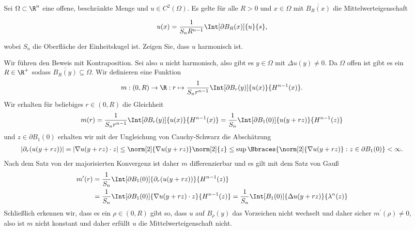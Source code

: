 
\begin{exercise}

Sei $\Omega \subset \R^n$ eine offene, beschränkte Menge und $u \in C^2(\Omega)$.
Es gelte für alle $R > 0$ und $x \in \Omega$ mit $\overline{B_R(x)}$ die Mittelwerteigenschaft

\begin{align*}
    u(x)
    =
    \frac{1}{S_n R^{n-1}}
    \Int[\partial B_R(x)]{u}{s},
\end{align*}

wobei $S_n$ die Oberfläche der Einheitskugel ist.
Zeigen Sie, dass $u$ harmonisch ist.

\end{exercise}


\begin{solution}

Wir führen den Beweis mit Kontraposition. Sei also $u$ nicht harmonisch, also gibt es $y \in \Omega$ mit $\Delta u(y) \neq 0$. Da $\Omega$ offen ist gibt es ein $R \in \R^+$ sodass $\overline{B_R(y)} \subseteq \Omega$. Wir definieren eine Funktion 
\begin{align*}
m: (0, R) \to \R : r \mapsto \frac{1}{S_n r^{n - 1}} \Int[\partial B_r(y)]{u(x)}{H^{n - 1}(x)}.
\end{align*}
Wir erhalten für beliebiges $r \in (0, R)$ die Gleichheit
\begin{align*}
m(r) = \frac{1}{S_n r^{n - 1}} \Int[\partial B_r(y)]{u(x)}{H^{n - 1}(x)} = \frac{1}{S_n}  \Int[\partial B_1(0)]{u(y + rz)}{H^{n - 1}(z)}
\end{align*}
und $z \in \partial B_1(0)$ erhalten wir mit der Ungleichung von Cauchy-Schwarz die Abschätzung
\begin{align*}
|\partial_r(u(y + rz))| = |\nabla u(y + rz) \cdot z| \leq \norm[2]{\nabla u(y + rz)} \norm[2]{z} \leq \sup\Bbraces{\norm[2]{\nabla u(y + rz)} : z \in \partial B_1(0)} < \infty.
\end{align*}
Nach dem Satz von der majorisierten Konvergenz ist daher $m$ differenzierbar und es gilt mit dem Satz von Gauß
\begin{align*}
m^\prime(r) &= \frac{1}{S_n}  \Int[\partial B_1(0)]{\partial_r(u(y + rz))}{H^{n - 1}(z)} \\
            &= \frac{1}{S_n}  \Int[\partial B_1(0)]{\nabla u(y + rz) \cdot z}{H^{n - 1}(z)} = \frac{1}{S_n}  \Int[B_1(0)]{\Delta u(y + rz)}{\lambda^n(z)}
\end{align*}
Schließlich erkennen wir, dass es ein $\rho \in (0, R)$ gibt so, dass $u$ auf $B_\rho(y)$ das Vorzeichen nicht wechselt und daher sicher $m^\prime(\rho) \neq 0$, also ist $m$ nicht konstant und daher erfüllt $u$ die Mittelwerteigenschaft nicht.
\end{solution}

